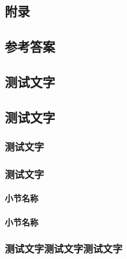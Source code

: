 \documentclass[color=orange]{textbook-cn}%
\begin{document}
\begin{Appendix}






\part*{附录}

\chapter{参考答案}
\tcbinputrecords

\chapter{测试文字}

\chapter*{测试文字}






\section{测试文字}

\lipsum[1-4]

\section{测试文字}
\subsection{小节名称}
\lipsum[1-4]

\subsection{小节名称}
\lipsum[1-2]

\Example{\lipsum[1][1-6]}
\Example{\lipsum[1][1-6]}

\Variety{\lipsum[1][1-6]}
\Variety{\lipsum[1][1-6]}

\lipsum[3-4]


\section*{测试文字测试文字测试文字}
\lipsum[1-8]
\RelaInfo{\lipsum[1-2]}


\end{Appendix}
\end{document}
